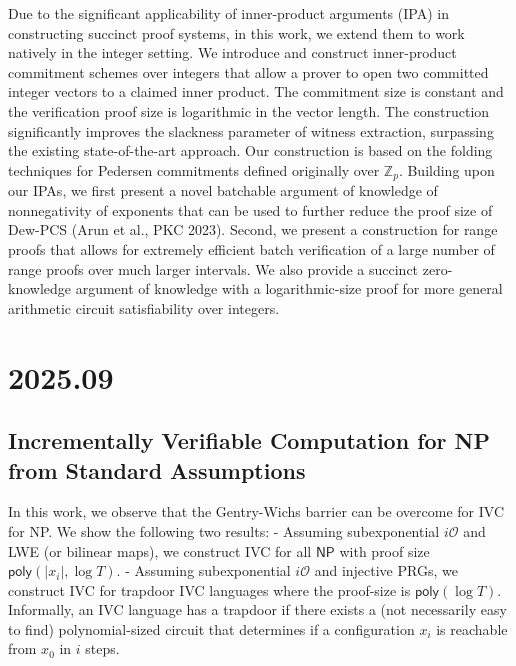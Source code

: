 \documentclass[11pt,oneside]{book}
\theoremstyle{definition}
\theoremstyle{remark}
\theoremstyle{plain}
\begin{document}
Due to the significant applicability of inner-product arguments (IPA) in constructing succinct proof systems, in this work, we extend them to work natively in the integer setting. We introduce and construct inner-product commitment schemes over integers that allow a prover to open two committed integer vectors to a claimed inner product. The commitment size is constant and the verification proof size is logarithmic in the vector length. The construction significantly improves the slackness parameter of witness extraction, surpassing the existing state-of-the-art approach. Our construction is based on the folding techniques for Pedersen commitments defined originally over $\mathbb{Z}_p$.
Building upon our IPAs, we first present a novel batchable argument of knowledge of nonnegativity of exponents that can be used to further reduce the proof size of Dew-PCS (Arun et al., PKC 2023). Second, we present a construction for range proofs that allows for extremely efficient batch verification of a large number of range proofs over much larger intervals. We also provide a succinct zero-knowledge argument of knowledge with a logarithmic-size proof for more general arithmetic circuit satisfiability over integers.


\chapter{2025.09}

\section{\cite{cryptoeprint:2025/1546} Incrementally Verifiable Computation for NP from Standard Assumptions}
In this work, we observe that the Gentry-Wichs barrier can be overcome for IVC for NP. We show the following two results: - Assuming subexponential $i\mathcal{O}$ and LWE (or bilinear maps), we construct IVC for all $\mathsf{NP}$ with proof size $\mathsf{poly}(|x_i|,\log T)$. - Assuming subexponential $i\mathcal{O}$ and injective PRGs, we construct IVC for trapdoor IVC languages where the proof-size is $\mathsf{poly}(\log T)$. Informally, an IVC language has a trapdoor if there exists a (not necessarily easy to find) polynomial-sized circuit that determines if a configuration $x_i$ is reachable from $x_0$ in $i$ steps.
\end{document}
